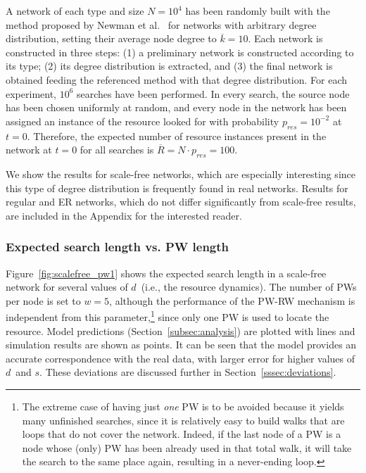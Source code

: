 \documentclass[]{elsarticle}
\newcommand{\s}		{\ensuremath{s}}		\newcommand{\sopt}	{\ensuremath{s_{opt}}}		\newcommand{\p}		{\ensuremath{p}}		\newcommand{\W}		{\ensuremath{W}}		\newcommand{\w}		{\ensuremath{w}}		\newcommand{\lsave}	{\ensuremath{\overline{l}_s}}	\newcommand{\lave}	{\ensuremath{\overline{l}}}	\newcommand{\lopt}	{\ensuremath{\overline{l}_{opt}}}
\newcommand{\N}		{\ensuremath{N}}		\newcommand{\kave}      {\ensuremath{\overline{k}}}     \newcommand{\kRWexp}    {\ensuremath{\overline{k}_{rw}}}\newcommand{\R}		{\ensuremath{\overline{R}}}		\newcommand{\pd}	{\ensuremath{d}}		\newcommand{\pa}	{\ensuremath{a}}
\newcommand{\pnoderes}  {\ensuremath{p_{res}}}
\begin{document}
A network of each type and size $N=10^4$ has been randomly built with the method proposed by Newman et al.~\cite{nets:Newman01} for networks with arbitrary degree distribution, setting their average node degree to $\kave=10$. Each network is constructed in three steps: (1) a preliminary network is constructed according to its type; (2) its degree distribution is extracted, and (3) the final network is obtained feeding the referenced method with that degree distribution. For each experiment, $10^6$ searches have been performed. In every search, the source node has been chosen uniformly at random, and every node in the network has been assigned an instance of the resource looked for with probability $\pnoderes=10^{-2}$ at $t\!=\!0$. Therefore, the expected number of resource instances present in the network at $t\!=\!0$ for all searches is $\R=\N \cdot \pnoderes = 100$.

We show the results for scale-free networks, which are especially interesting since this type of degree distribution is frequently found in real networks.  Results for regular and ER networks, which do not differ significantly from scale-free results, are included in the Appendix for the interested reader. \\


\subsubsection{Expected search length vs. PW length}

Figure~\ref{fig:scalefree_pw1} shows the expected search length in a scale-free network for several values of \pd\ (i.e., the resource dynamics).
The number of PWs per node is set to $\w=5$, although the performance of the PW-RW mechanism is independent from this parameter,\footnote{
The extreme case of having just \emph{one} PW is to be avoided because it yields many unfinished searches, since it is relatively easy to build walks that are loops that do not cover the network. Indeed, if the last node of a PW is a node whose (only) PW has been already used in that total walk, it will take the search to the same place again, resulting in a never-ending loop.} since only one PW is used to locate the resource.
Model predictions (Section~\ref{subsec:analysis}) are plotted with lines and simulation results are shown as points. It can be seen that the model provides an accurate correspondence with the real data, with larger error for higher values of \pd\ and \s. These deviations are discussed further in Section~\ref{sssec:deviations}.
\end{document}
